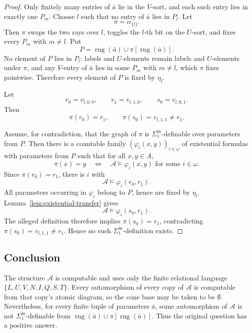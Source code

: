 \documentclass[12pt]{article}
\theoremstyle{definition}
\theoremstyle{remark}
\newcommand{\rng}{\operatorname{rng}}
\begin{document}
\begin{proof}
Only finitely many entries of \(\bar a\) lie in the \(V\)-sort, and each such entry lies in exactly one \(P_m\).  Choose \(l\) such that no entry of \(\bar a\) lies in \(P_l\).  Let
\[
\pi=\alpha_{\{l\}}.
\]
Then \(\pi\) swaps the two rays over \(l\), toggles the \(l\)-th bit on the \(U\)-sort, and fixes every \(P_m\) with \(m\neq l\).  Put
\[
P=\rng(\bar a)\cup \pi[\rng(\bar a)].
\]
No element of \(P\) lies in \(P_l\): labels and \(U\)-elements remain labels and \(U\)-elements under \(\pi\), and any \(V\)-entry of \(\bar a\) lies in some \(P_m\) with \(m\neq l\), which \(\pi\) fixes pointwise.  Therefore every element of \(P\) is fixed by \(\eta_l\).

Let
\[
r_0=v_{l,0,0},\qquad r_1=v_{l,1,0},\qquad s_0=v_{l,0,1}.
\]
Then
\[
\pi(r_0)=r_1,
\qquad
\pi(s_0)=v_{l,1,1}\neq r_1.
\]

Assume, for contradiction, that the graph of \(\pi\) is \(\Sigma^{\mathrm{in}}_1\)-definable over parameters from \(P\).  Then there is a countable family \((\varphi_i(x,y))_{i\in\omega}\) of existential formulas with parameters from \(P\) such that for all \(x,y\in A\),
\[
\pi(x)=y
\quad\Longleftrightarrow\quad
\mathcal A\models\varphi_i(x,y)\text{ for some }i\in\omega.
\]
Since \(\pi(r_0)=r_1\), there is \(i\) with
\[
\mathcal A\models\varphi_i(r_0,r_1).
\]
All parameters occurring in \(\varphi_i\) belong to \(P\), hence are fixed by \(\eta_l\).  Lemma~\ref{lem:existential-transfer} gives
\[
\mathcal A\models\varphi_i(s_0,r_1).
\]
The alleged definition therefore implies \(\pi(s_0)=r_1\), contradicting \(\pi(s_0)=v_{l,1,1}\neq r_1\).  Hence no such \(\Sigma^{\mathrm{in}}_1\)-definition exists.
\end{proof}

\subsection*{Conclusion}

The structure \(\mathcal A\) is computable and uses only the finite relational language \(\{L,U,V,N,I,Q,S,T\}\).  Every automorphism of every copy of \(\mathcal A\) is computable from that copy's atomic diagram, so the cone base may be taken to be \(\emptyset\).  Nevertheless, for every finite tuple of parameters \(\bar a\), some automorphism of \(\mathcal A\) is not \(\Sigma^{\mathrm{in}}_1\)-definable from \(\rng(\bar a)\cup\pi[\rng(\bar a)]\).  Thus the original question has a positive answer.
\end{document}
